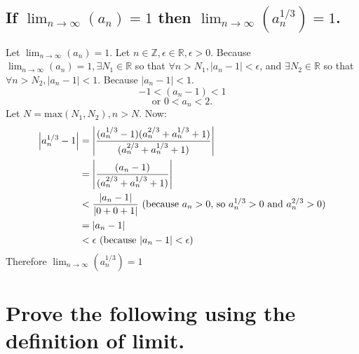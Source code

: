 \documentclass[10pt, letterpaper, titlepage]{article}
\newcommand{\0}{\varnothing}
\newcommand{\Z}{\mathbb{Z}}
\newcommand{\R}{\mathbb{R}}
\newcommand\abs[1]{\left|#1\right|}
\newcommand{\lntinf}{\lim_{n \to \infty}}
\newcommand{\1}{\{ 1 \}}
\newcommand{\2}{\{ (1,1) \}}
\newcommand{\e}{\epsilon}
\newcommand{\an}{a_n}
\begin{document}
        \newpage
        \subsection{If $\lntinf (\an) = 1$ then $\lntinf (a_n^{1/3}) = 1$.}
            Let $\lntinf (\an) = 1$. Let $n \in \Z, \e \in \R, \e > 0$.
            Because $\lntinf (\an) = 1, \exists N_1 \in \R$ so that $\forall n > N_1, \abs{\an - 1} < \e$,
            and $\exists N_2 \in \R$ so that $\forall n > N_2, \abs{\an - 1} < 1$.
            Because $\abs{\an - 1} < 1$.
            $$-1 < (\an - 1) < 1$$
            $$\text{or } 0 < \an < 2.$$
            Let $N = \text{max}(N_1, N_2), n > N$.
            Now:
            \begin{align*}
                \abs{\an^{1/3} -1} &= \abs{\frac{(\an^{1/3}-1)(\an^{2/3}+\an^{1/3} + 1)}{(\an^{2/3}+\an^{1/3} + 1)}}\\
                &= \abs{\frac{(\an-1)}{(\an^{2/3}+\an^{1/3} + 1)}}\\
                &< \frac{\abs{\an-1}}{\abs{0+0+1}} \text{ (because $\an >0$, so $\an^{1/3} > 0$ and $ \an^{2/3}>0$)}\\
                &= \abs{\an-1}\\
                &< \e \text{ (because $\abs{\an-1} < \e$)}
            \end{align*}
            Therefore $\lntinf (\an^{1/3}) = 1$


    \newpage
    \section{Prove the following using the definition of limit.}
\end{document}
